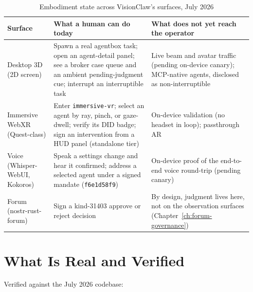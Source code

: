 \begin{table}[h]
\centering
\caption{Embodiment state across VisionClaw's surfaces, July 2026}
\label{tab:embodiment-surfaces}
\begin{tabularx}{\textwidth}{L{3.4cm} X L{4.2cm}}
\toprule
\textbf{Surface} & \textbf{What a human can do today} & \textbf{What does not yet reach the operator} \\
\midrule
Desktop 3D (2D screen) & Spawn a real agentbox task; open an agent-detail panel; see a broker case queue and an ambient pending-judgment cue; interrupt an interruptible task & Live beam and avatar traffic (pending on-device canary); MCP-native agents, disclosed as non-interruptible \\
\addlinespace
Immersive WebXR (Quest-class) & Enter \texttt{immersive-vr}; select an agent by ray, pinch, or gaze-dwell; verify its DID badge; sign an intervention from a HUD panel (standalone tier) & On-device validation (no headset in loop); passthrough AR \\
\addlinespace
Voice (Whisper-WebUI, Kokoros) & Speak a settings change and hear it confirmed; address a selected agent under a signed mandate (\texttt{f6e1d58f9}) & On-device proof of the end-to-end voice round-trip (pending canary) \\
\addlinespace
Forum (nostr-rust-forum) & Sign a kind-31403 approve or reject decision & By design, judgment lives here, not on the observation surfaces (Chapter~\ref{ch:forum-governance}) \\
\bottomrule
\end{tabularx}
\end{table}

\section{What Is Real and Verified}

Verified against the July 2026 codebase:

